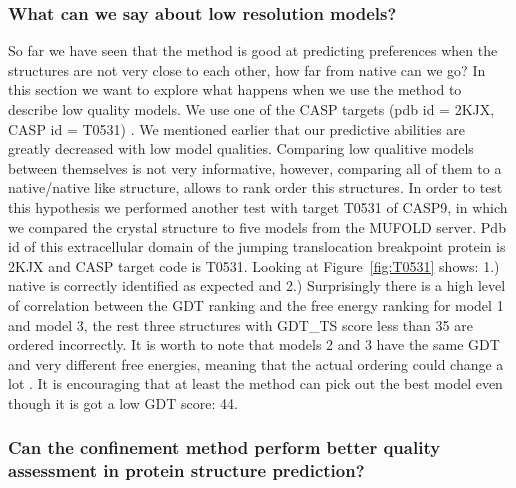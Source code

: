\documentclass[12pt]{article}
\begin{document}
\subsubsection{What can we say about low resolution models?}

So far we have seen that the method is good at predicting preferences when the structures are not
very close to each other, how far from native can we go? In this section we want to explore what
happens when we use the method to describe low quality models. We use one of the CASP targets (pdb
id = 2KJX, CASP id = T0531) . We mentioned earlier that our predictive abilities are greatly
decreased with low model qualities. Comparing low qualitive models between themselves is not very
informative, however, comparing all of them to a native/native like structure, allows to rank order
this structures. In order to test this hypothesis we performed another test with target T0531 of
CASP9, in which we compared the crystal structure to five models from the MUFOLD server. Pdb id of
this extracellular domain of the jumping translocation breakpoint protein is 2KJX and CASP target
code is T0531. Looking at Figure~\ref{fig:T0531} shows: 1.) native is correctly identified as
expected and 2.) Surprisingly there is a high level of correlation between the GDT ranking and the
free energy ranking for model 1 and model 3, the rest three structures with GDT\_TS score less than
35  are ordered incorrectly. It is worth to note that models 2 and 3 have the same GDT and very
different free energies, meaning that the actual ordering could change a lot \cite{Perez2012}. It is
encouraging that at least the method can pick out the best model even though it is got a low GDT
score: 44.  

\subsubsection{Can the confinement method perform better quality assessment in protein structure prediction?}
\end{document}
